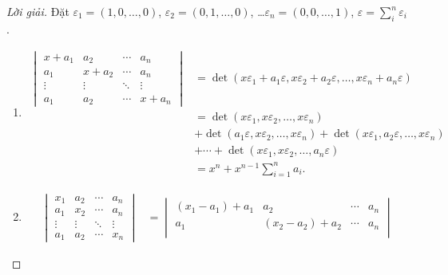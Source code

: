 \documentclass[class=nhvh-linear-algebra,crop=false]{standalone}
\begin{document}
\begin{proof}[Lời giải]
	\par Đặt $\varepsilon_{1} = (1, 0, \ldots, 0)$, $\varepsilon_{2} = (0, 1, \ldots, 0)$, \ldots $\varepsilon_{n} = (0, 0, \ldots, 1)$, $\varepsilon = \displaystyle\sum^{n}_{i}\varepsilon_{i}$.
	\begin{enumerate}[label = (\alph*)]
		\item
		      \begin{align*}
			      \begin{vmatrix}
				      x + a_{1} & a_{2}     & \cdots & a_{n}     \\
				      a_{1}     & x + a_{2} & \cdots & a_{n}     \\
				      \vdots    & \vdots    & \ddots & \vdots    \\
				      a_{1}     & a_{2}     & \cdots & x + a_{n}
			      \end{vmatrix}
			       & = \det(x\varepsilon_{1} + a_{1}\varepsilon, x\varepsilon_{2} + a_{2}\varepsilon, \ldots, x\varepsilon_{n} + a_{n}\varepsilon)             \\
			       & = \det(x\varepsilon_{1}, x\varepsilon_{2}, \ldots, x\varepsilon_{n})                                                                      \\
			       & + \det(a_{1}\varepsilon, x\varepsilon_{2}, \ldots, x\varepsilon_{n}) + \det(x\varepsilon_{1}, a_{2}\varepsilon, \ldots, x\varepsilon_{n}) \\
			       & + \cdots + \det(x\varepsilon_{1}, x\varepsilon_{2}, \ldots, a_{n}\varepsilon)                                                             \\
			       & = x^{n} + x^{n-1}\sum^{n}_{i=1}a_{i}.
		      \end{align*}
		\item
		      \begin{align*}
			      \begin{vmatrix}
				      x_{1}  & a_{2}  & \cdots & a_{n}  \\
				      a_{1}  & x_{2}  & \cdots & a_{n}  \\
				      \vdots & \vdots & \ddots & \vdots \\
				      a_{1}  & a_{2}  & \cdots & x_{n}
			      \end{vmatrix}
			       & =
			      \begin{vmatrix}
				      (x_{1} - a_{1}) + a_{1} & a_{2}                   & \cdots & a_{n}                   \\
				      a_{1}                   & (x_{2} - a_{2}) + a_{2} & \cdots & a_{n}                   \\

\end{vmatrix}
\end{align*}
\end{enumerate}
\end{proof}
\end{document}
